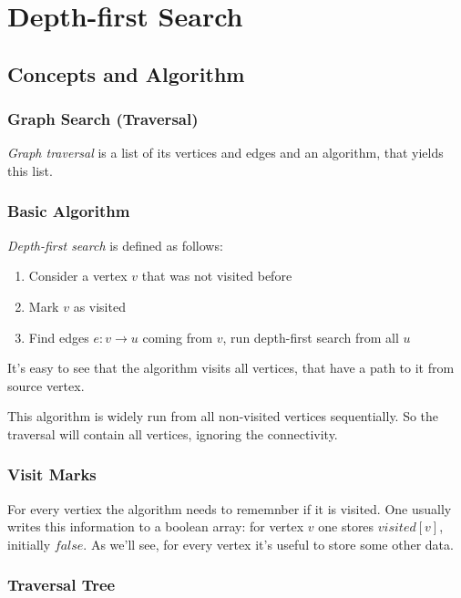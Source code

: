 \documentclass[a4paper,12pt]{article}
\begin{document}
  \section{Depth-first Search}

    \subsection{Concepts and Algorithm}

      \subsubsection{Graph Search (Traversal)}

      \emph{Graph traversal} is a list of its vertices and edges
      and an algorithm, that yields this list.

      \subsubsection{Basic Algorithm}

      \emph{Depth-first search} is defined as follows:
      \begin{enumerate}
        \item Consider a vertex $v$ that was not visited before
        \item Mark $v$ as visited
        \item Find edges $e: v \to u$ coming from $v$,
          run depth-first search from all $u$
      \end{enumerate}

      It's easy to see that the algorithm visits all vertices,
      that have a path to it from source vertex.

      This algorithm is widely run from all non-visited vertices
      sequentially. So the traversal will contain all vertices,
      ignoring the connectivity.

      \subsubsection{Visit Marks}

      For every vertiex the algorithm needs to rememnber if it is
      visited. One usually writes this information to a boolean array:
      for vertex $v$ one stores $visited[v]$, initially $false$.
      As we'll see, for every vertex it's useful to store some other
      data.

      \subsubsection{Traversal Tree}
\end{document}
